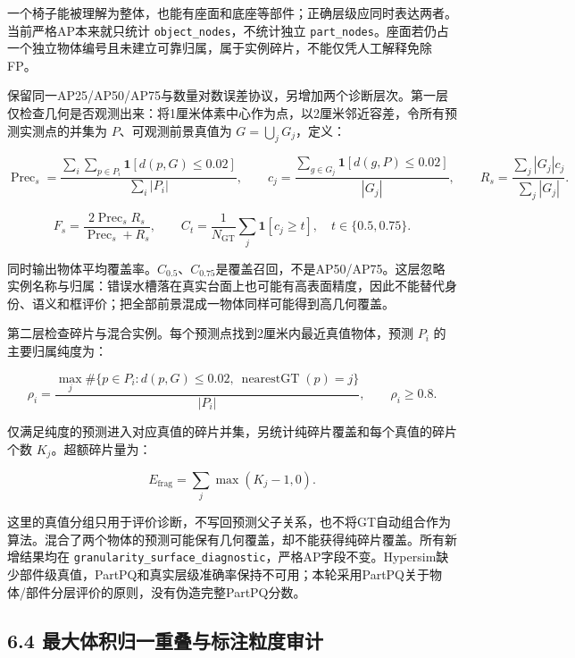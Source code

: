 \documentclass[UTF8,fontset=fandol]{ctexart}
\begin{document}
一个椅子能被理解为整体，也能有座面和底座等部件；正确层级应同时表达两者。当前严格AP本来就只统计 \texttt{object\_\allowbreak{}nodes}，不统计独立 \texttt{part\_\allowbreak{}nodes}。座面若仍占一个独立物体编号且未建立可靠归属，属于实例碎片，不能仅凭人工解释免除FP。



保留同一AP25/AP50/AP75与数量对数误差协议，另增加两个诊断层次。第一层仅检查几何是否观测出来：将1厘米体素中心作为点，以2厘米邻近容差，令所有预测实测点的并集为 $P$、可观测前景真值为 $G=\bigcup_jG_j$，定义：



\[
\operatorname{Prec}_{s}=\frac{\sum_i\sum_{p\in P_i}\mathbf1[d(p,G)\le0.02]}{\sum_i|P_i|},\qquad
c_j=\frac{\sum_{g\in G_j}\mathbf1[d(g,P)\le0.02]}{|G_j|},
\qquad R_s=\frac{\sum_j|G_j|c_j}{\sum_j|G_j|}.
\]

\[
F_s=\frac{2\operatorname{Prec}_{s}R_s}{\operatorname{Prec}_{s}+R_s},\qquad
C_t=\frac1{N_{\mathrm{GT}}}\sum_j\mathbf1[c_j\ge t],\quad t\in\{0.5,0.75\}.
\]

同时输出物体平均覆盖率。$C_{0.5}$、$C_{0.75}$是覆盖召回，不是AP50/AP75。这层忽略实例名称与归属：错误水槽落在真实台面上也可能有高表面精度，因此不能替代身份、语义和框评价；把全部前景混成一物体同样可能得到高几何覆盖。



第二层检查碎片与混合实例。每个预测点找到2厘米内最近真值物体，预测 $P_i$ 的主要归属纯度为：



\[
\rho_i=\frac{\max_j\#\{p\in P_i:d(p,G)\le0.02,\ \operatorname{nearestGT}(p)=j\}}{|P_i|},
\qquad\rho_i\ge0.8.
\]

仅满足纯度的预测进入对应真值的碎片并集，另统计纯碎片覆盖和每个真值的碎片个数 $K_j$。超额碎片量为：



\[
E_{\mathrm{frag}}=\sum_j\max(K_j-1,0).
\]

这里的真值分组只用于评价诊断，不写回预测父子关系，也不将GT自动组合作为算法。混合了两个物体的预测可能保有几何覆盖，却不能获得纯碎片覆盖。所有新增结果均在 \texttt{granularity\_\allowbreak{}surface\_\allowbreak{}diagnostic}，严格AP字段不变。Hypersim缺少部件级真值，PartPQ和真实层级准确率保持不可用；本轮采用PartPQ关于物体/部件分层评价的原则，没有伪造完整PartPQ分数。



\subsection*{6.4 最大体积归一重叠与标注粒度审计}
\end{document}
